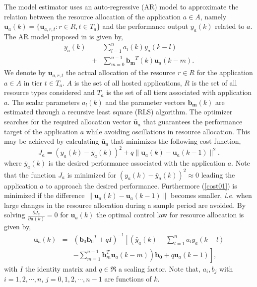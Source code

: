 The model estimator uses an auto-regressive (AR) model to approximate the relation between the resource allocation of the application
$a \in A$, namely $\mathbf{u}_{a}(k) = \{ \mathbf{u}_{a,r,t}:r \in R, t \in T_{a} \}$ and the performance output $y_{a}(k)$ related to $a$. The AR model proposed in \cite{Abdelzaher-SIGMETRICS-2008} is given by,
\begin{eqnarray}
 y_{a}(k) &=& \sum_{l=1}^{n}a_{l}(k)y_{a}(k-l) \nonumber \\
& + & \sum_{m=0}^{n-1}\mathbf{b_{m}}^{T}(k)\mathbf{u}_{a}(k-m). \nonumber
\end{eqnarray}
We denote by $\mathbf{u}_{a,r,t}$ the actual allocation of the resource $r \in R$ for the application $a \in A$ in tier $t \in T_{a}$.
$A$ is the set of all hosted applications, $R$ is the set of all resource types considered and $T_{a}$ is the set of all tiers 
associated with application $a$. The scalar parameters $a_{l}(k)$ and the parameter vectors $\mathbf{b_{m}}(k)$ are estimated 
through a recursive least square (RLS) algorithm.
The optimizer searches for the required allocation vector ${\mathbf{\bar{u}}_{a}}$ that guarantees the performance target of the application $a$ while avoiding oscillations in 
resource allocation. This may be achieved by calculating $\mathbf{\bar{u}}_{a}$ that minimizes the following cost function,
\begin{equation}
 J_{a} = \left(y_{a}(k) - \bar{y}_{a}(k) \right)^{2} + q \| \mathbf{u}_{a}(k) - {\mathbf{u}_{a}}(k-1) \|^{2}.
\label{cost01}
\end{equation}
where $\bar{y}_{a}(k)$ is the desired performance associated with the application $a$. Note that the function $J_a$ is minimized for $\left(y_{a}(k) - \bar{y}_{a}(k) \right)^{2} \approx 0$
 leading the application $a$ to approach the desired performance. Furthermore (\ref{cost01}) is minimized if the difference 
$\| \mathbf{u}_{a}(k) - {\mathbf{u}_{a}}(k-1) \|$ becomes smaller, \emph{i.e.} when large changes in the resource allocation  during a sample period are avoided.
By solving $\frac{\partial J_{a}}{\partial{\mathbf{u}(k)}} = 0$ for $\mathbf{u}_{a}(k)$ the optimal control law for resource allocation is given by,
\begin{eqnarray}
 {\mathbf{\bar{u}}_{a}}(k) & = & ({\mathbf{b}_{0}\mathbf{b}_{0}}^{T} + qI)^{-1}\left[ \left(\bar{y}_{a}(k) - \sum_{l=1}^{n}a_{l}y_{a}(k-l)\right. \right. \nonumber \\
& & \left. \left.- \sum_{m=1}^{n-1}\mathbf{b}_{m}^{T}\mathbf{u}_{a}(k-m)\right)\mathbf{b_{0}} + q\mathbf{u}_{a}(k-1) \right], \nonumber
\end{eqnarray}
with $I$ the identity matrix and $q \in \Re$ a scaling factor. Note that, $a_i, b_j$ with $i=1,2,\cdots,n$, $j=0,1,2,\cdots,n-1$ are functions of $k$.


